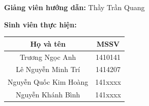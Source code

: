 \documentclass[12pt]{report}
\begin{document}
\begin{titlepage}
\vspace{5mm}

\textbf{Giảng viên hướng dẫn: } Thầy Trần Quang

\vspace{5mm}

\textbf{Sinh viên thực hiện:}\\

 \begin{tabular}{| c | c |} 
 \hline
\textbf{ Họ và tên }& \textbf{MSSV} \\ [0.5ex] 
 \hline
 Trương Ngọc Anh & 1410141 \\ 
 \hline
 Lê Nguyễn Minh Trí & 1414207 \\
 \hline
 Nguyễn Quốc Kim Hoàng & 141xxxx \\
 \hline
 Nguyễn Khánh Bình & 141xxxx \\
 \hline
\end{tabular}
\thispagestyle{empty}
\end{titlepage}


%

\tableofcontents

%

%
\listoffigures
\listoftables
%
\newpage\cleardoublepage
\newpage\cleardoublepage
\newpage\cleardoublepage
\newpage\cleardoublepage
%
\nocite{*}
\newpage\cleardoublepage


\end{document}
